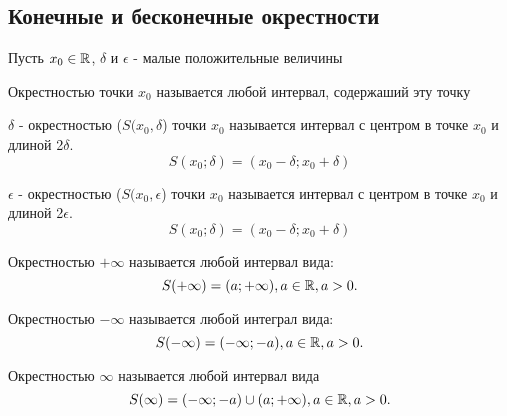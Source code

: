 \subsection{Конечные и бесконечные окрестности}

Пусть $x_0\in \mathbb{R}$, $\delta$ и $\epsilon$ - малые положительные величины

\begin{definition}
  Окрестностью точки $x_0$ называется любой интервал, содержаший эту точку
\end{definition}

\begin{definition}
  $\delta$ - окрестностью ($S(x_0, \delta$) точки $x_0$ называется интервал с центром в точке $x_0$ и длиной 2$\delta$.
  \[
  S(x_0; \delta) = (x_0 - \delta; x_0 + \delta)
  \] 
\end{definition}

\begin{definition}
  $\epsilon$ - окрестностью ($S(x_0, \epsilon$) точки $x_0$ называется интервал с центром в точке $x_0$ и длиной 2$\epsilon$.
  \[
  S(x_0; \delta) = (x_0 - \delta; x_0 + \delta)
  \] 
\end{definition}

\begin{definition}
  Окрестностью $+\infty$ называется любой интервал вида:
  \[
  S(+\infty) = (a; +\infty), a\in \mathbb{R}, a > 0
  .\] 
\end{definition}

\begin{definition}
  Окрестностью $-\infty$ называется любой интеграл вида:
  \[
  S(-\infty) = (-\infty; -a), a\in \mathbb{R}, a > 0
  .\] 
\end{definition}

\begin{definition}
  Окрестностью $\infty$ называется любой интервал вида
  \[
  S(\infty) = (-\infty; -a) \cup (a; +\infty), a\in \mathbb{R}, a > 0
  .\] 
\end{definition}

